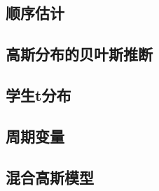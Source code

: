 \subsection*{顺序估计}
\subsection*{高斯分布的贝叶斯推断}
\subsection*{学生t分布}
\subsection*{周期变量}
\subsection*{混合高斯模型}